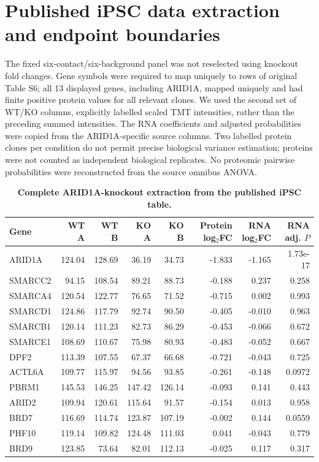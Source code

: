 \documentclass[11pt,letterpaper]{article}
\begin{document}
\clearpage
\section*{Published iPSC data extraction and endpoint boundaries}
The fixed six-contact/six-background panel was not reselected using knockout fold changes. Gene symbols were required to map uniquely to rows of original Table S6; all 13 displayed genes, including ARID1A, mapped uniquely and had finite positive protein values for all relevant clones. We used the second set of WT/KO columns, explicitly labelled scaled TMT intensities, rather than the preceding summed intensities. The RNA coefficients and adjusted probabilities were copied from the ARID1A-specific source columns. Two labelled protein clones per condition do not permit precise biological variance estimation; proteins were not counted as independent biological replicates. No proteomic pairwise probabilities were reconstructed from the source omnibus ANOVA.

\begin{table}[H]\centering\scriptsize
\caption{\textbf{Complete ARID1A-knockout extraction from the published iPSC table.}}\label{tab:ipsc}
\begin{tabular}{lrrrrrrr}\toprule
Gene & WT A & WT B & KO A & KO B & Protein log$_2$FC & RNA log$_2$FC & RNA adj. $P$ \\
\midrule
ARID1A & 124.04 & 128.69 & 36.19 & 34.73 & -1.833 & -1.165 & 1.73e-17 \\
SMARCC2 & 94.15 & 108.54 & 89.21 & 88.73 & -0.188 & 0.237 & 0.258 \\
SMARCA4 & 120.54 & 122.77 & 76.65 & 71.52 & -0.715 & 0.002 & 0.993 \\
SMARCD1 & 124.86 & 117.79 & 92.74 & 90.50 & -0.405 & -0.010 & 0.963 \\
SMARCB1 & 120.14 & 111.23 & 82.73 & 86.29 & -0.453 & -0.066 & 0.672 \\
SMARCE1 & 108.69 & 110.67 & 75.98 & 80.93 & -0.483 & -0.052 & 0.667 \\
DPF2 & 113.39 & 107.55 & 67.37 & 66.68 & -0.721 & -0.043 & 0.725 \\
ACTL6A & 109.77 & 115.97 & 94.56 & 93.85 & -0.261 & -0.148 & 0.0972 \\
PBRM1 & 145.53 & 146.25 & 147.42 & 126.14 & -0.093 & 0.141 & 0.443 \\
ARID2 & 109.94 & 120.61 & 115.64 & 91.57 & -0.154 & 0.013 & 0.958 \\
BRD7 & 116.69 & 114.74 & 123.87 & 107.19 & -0.002 & 0.144 & 0.0559 \\
PHF10 & 119.14 & 109.82 & 124.48 & 111.03 & 0.041 & -0.043 & 0.779 \\
BRD9 & 123.85 & 73.64 & 82.01 & 112.13 & -0.025 & 0.117 & 0.317 \\
\bottomrule\end{tabular}\end{table}
\end{document}
